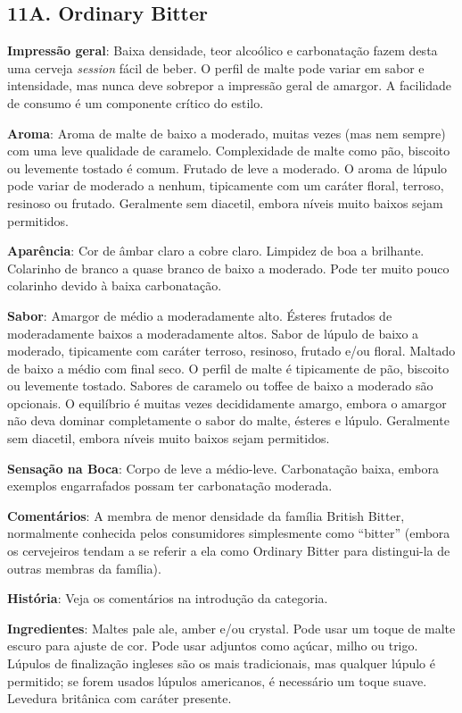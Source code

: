\subsection*{11A. Ordinary Bitter}
\textbf{Impressão geral}: Baixa densidade, teor alcoólico e carbonatação fazem desta uma cerveja \textit{session} fácil de beber. O perfil de malte pode variar em sabor e intensidade, mas nunca deve sobrepor a impressão geral de amargor. A facilidade de consumo é um componente crítico do estilo.

\textbf{Aroma}: Aroma de malte de baixo a moderado, muitas vezes (mas nem sempre) com uma leve qualidade de caramelo. Complexidade de malte como pão, biscoito ou levemente tostado é comum. Frutado de leve a moderado. O aroma de lúpulo pode variar de moderado a nenhum, tipicamente com um caráter floral, terroso, resinoso ou frutado. Geralmente sem diacetil, embora níveis muito baixos sejam permitidos.

\textbf{Aparência}: Cor de âmbar claro a cobre claro. Limpidez de boa a brilhante. Colarinho de branco a quase branco de baixo a moderado. Pode ter muito pouco colarinho devido à baixa carbonatação.

\textbf{Sabor}: Amargor de médio a moderadamente alto. Ésteres frutados de moderadamente baixos a moderadamente altos. Sabor de lúpulo de baixo a moderado, tipicamente com caráter terroso, resinoso, frutado e/ou floral. Maltado de baixo a médio com final seco. O perfil de malte é tipicamente de pão, biscoito ou levemente tostado. Sabores de caramelo ou toffee de baixo a moderado são opcionais. O equilíbrio é muitas vezes decididamente amargo, embora o amargor não deva dominar completamente o sabor do malte, ésteres e lúpulo. Geralmente sem diacetil, embora níveis muito baixos sejam permitidos.

\textbf{Sensação na Boca}: Corpo de leve a médio-leve. Carbonatação baixa, embora exemplos engarrafados possam ter carbonatação moderada.

\textbf{Comentários}: A membra de menor densidade da família British Bitter, normalmente conhecida pelos consumidores simplesmente como “bitter” (embora os cervejeiros tendam a se referir a ela como Ordinary Bitter para distingui-la de outras membras da família).

\textbf{História}: Veja os comentários na introdução da categoria.

\textbf{Ingredientes}: Maltes pale ale, amber e/ou crystal. Pode usar um toque de malte escuro para ajuste de cor. Pode usar adjuntos como açúcar, milho ou trigo. Lúpulos de finalização ingleses são os mais tradicionais, mas qualquer lúpulo é permitido; se forem usados lúpulos americanos, é necessário um toque suave. Levedura britânica com caráter presente.

